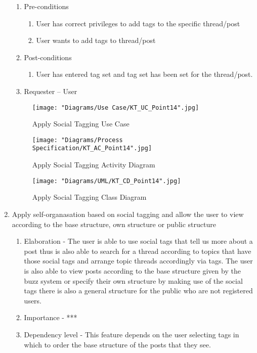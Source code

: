\documentclass[12pt]{article}
\begin{document}
\begin{enumerate}
\begin{enumerate}
    \item Pre-conditions
    \begin{enumerate}
    	\item User has correct privileges to add tags to the specific thread/post
    	\item User wants to add tags to thread/post
    \end{enumerate}
        \item Post-conditions
    \begin{enumerate}
    	\item User has entered tag set and tag set has been set for the thread/post.
    \end{enumerate}
    \item Requester – User
  \end{enumerate}
\begin{figure}[h]
	\centering
	\texttt{[image: "Diagrams/Use Case/KT\_UC\_Point14".jpg]}
	\caption{Apply Social Tagging Use Case}
\end{figure}
\begin{figure}[h]
	\centering
	\texttt{[image: "Diagrams/Process Specification/KT\_AC\_Point14".jpg]}
	\caption{Apply Social Tagging Activity Diagram}
\end{figure}
\begin{figure}[h]
	\centering
	\texttt{[image: "Diagrams/UML/KT\_CD\_Point14".jpg]}
	\caption{Apply Social Tagging Class Diagram}
\end{figure}
\newpage %
   \item Apply self-organasation based on social tagging and allow the user to view according to the base structure, own structure or public structure %
  \begin{enumerate}
    \item Elaboration - The user is able to use social tags that tell us more about a post thus is also able to search for a thread according to topics that have those social tags and arrange topic threads accordingly via tags. The user is also able to view posts according to the base structure given by the buzz system or specify their own structure by making use of the social tags there is also a general structure for the public who are not registered users. 
    \item Importance - ***
    \item Dependency level - This feature depends on the user selecting tags in which to order the base structure of the posts that they see.

\end{enumerate}
\end{enumerate}
\end{document}
